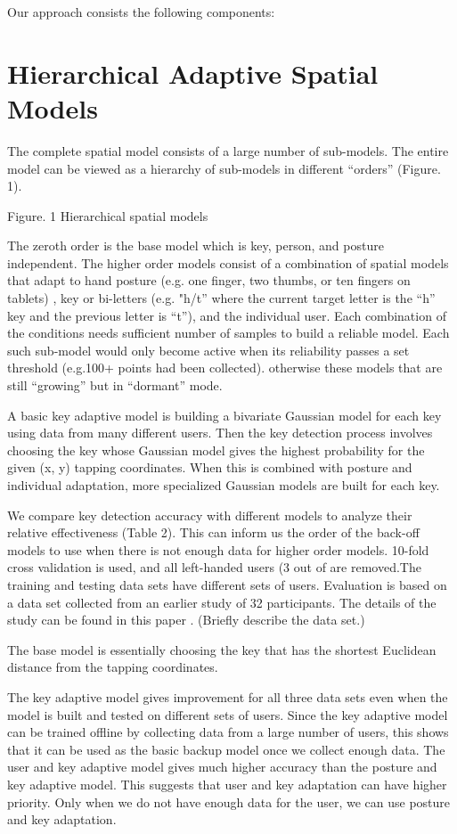 \documentclass{sigchi}
\begin{document}
Our approach consists the following components:

\section{Hierarchical Adaptive Spatial Models}

The complete spatial model consists of a large number of sub-models. The entire model can be viewed as a hierarchy of sub-models in different “orders” (Figure. 1).

Figure. 1 Hierarchical spatial models

The zeroth order is the base model which is key, person, and posture independent. The higher order models consist of a combination of spatial models that adapt to hand posture (e.g. one finger, two thumbs, or ten fingers on tablets) , key or bi-letters (e.g. "h/t” where the current target letter is the “h” key and the previous letter is “t”), and the individual user. Each combination of the conditions needs sufficient number of samples to build a reliable model. Each such sub-model would only become active when its reliability passes a set threshold (e.g.100+ points had been collected). otherwise these models that are still “growing” but in “dormant” mode. 

A basic key adaptive model is building a bivariate Gaussian model for each key using data from many different users. Then the key detection process involves choosing the key whose Gaussian model gives the highest probability for the given (x, y) tapping coordinates. When this is combined with posture and individual adaptation, more specialized Gaussian models are built for each key.

We compare key detection accuracy with different models to analyze their relative effectiveness (Table 2). This can inform us the order of the back-off models to use when there is not enough data for higher order models. 10-fold cross validation is used, and all left-handed users (3 out of are removed.The training and testing data sets have different sets of users.
Evaluation is based on a data set collected from an earlier study of 32
participants. The details of the study can be found in this paper \cite{}. 
(Briefly describe the data set.)

The base model is essentially choosing the key that has the shortest Euclidean distance from the tapping coordinates. 

The key adaptive model gives improvement for all three data sets even when the model is built and tested on different sets of users. Since the key adaptive model can be trained offline by collecting data from a large number of users, this shows that it can be used as the basic backup model once we collect enough data. The user and key adaptive model gives much higher accuracy than the posture and key adaptive model. This suggests that user and key adaptation can have higher priority. Only when we do not have enough data for the user, we can use posture and key adaptation. 
\end{document}
